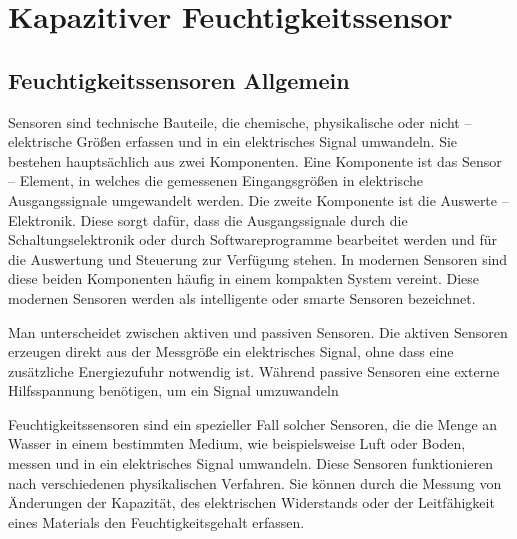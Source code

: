 %
%

\chapter{Kapazitiver Feuchtigkeitssensor}

	\section{Feuchtigkeitssensoren Allgemein}
		Sensoren sind technische Bauteile, die chemische, physikalische oder nicht – elektrische Größen erfassen und in ein elektrisches Signal umwandeln. Sie bestehen hauptsächlich aus zwei Komponenten. Eine Komponente ist das Sensor – Element, in welches die gemessenen Eingangsgrößen in elektrische Ausgangssignale umgewandelt werden. Die zweite Komponente ist die Auswerte – Elektronik. Diese sorgt dafür, dass die Ausgangssignale durch die Schaltungselektronik oder durch Softwareprogramme bearbeitet werden und für die Auswertung und Steuerung zur Verfügung stehen. In modernen Sensoren sind diese beiden Komponenten häufig in einem kompakten System vereint. Diese modernen Sensoren werden als intelligente oder smarte Sensoren bezeichnet.
		 
		\vspace{1\baselineskip}
				
		Man unterscheidet zwischen aktiven und passiven Sensoren. Die aktiven Sensoren erzeugen direkt aus der Messgröße ein elektrisches Signal, ohne dass eine zusätzliche Energiezufuhr notwendig ist. Während passive Sensoren eine externe Hilfsspannung benötigen, um ein Signal umzuwandeln
		\cite{Hering:2023}
		
		\vspace{1\baselineskip}
		
		Feuchtigkeitssensoren sind ein spezieller Fall solcher Sensoren, die die Menge an Wasser in einem bestimmten Medium, wie beispielsweise Luft oder Boden, messen und in ein elektrisches Signal umwandeln. Diese Sensoren funktionieren nach verschiedenen physikalischen Verfahren. Sie können durch die Messung von Änderungen der Kapazität, des elektrischen Widerstands oder der Leitfähigkeit eines Materials den Feuchtigkeitsgehalt erfassen.
		\cite{Farahani:2014}

